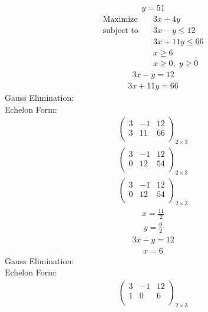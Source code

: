 \documentclass{article}
\begin{document}
\begin{align*}
y=51\end{align*}
\begin{align*}
\text{Maximize} \quad & 3x + 4y\\
\text{subject to} \quad
& 3x - y\le12\\
& 3x + 11y\le66\\
& x\ge6\\
& x\ge0,\; y\ge0\end{align*}
\begin{align*}
3x - y=12\end{align*}
\begin{align*}
3x + 11y=66\end{align*}
Gauss Elimination:\\
Echelon Form:\\
\begin{align*}
\left(
\begin{array}{cc|c}
3 & -1 & 12\\
3 & 11 & 66\\
\end{array}
\right)_{2\times 3}
\end{align*}
\begin{align*}
\left(
\begin{array}{cc|c}
3 & -1 & 12\\
0 & 12 & 54\\
\end{array}
\right)_{2\times 3}
\end{align*}
\begin{align*}
\left(
\begin{array}{cc|c}
3 & -1 & 12\\
0 & 12 & 54\\
\end{array}
\right)_{2\times 3}
\end{align*}
\begin{align*}
x=\frac{11}{2}\end{align*}
\begin{align*}
y=\frac{9}{2}\end{align*}
\begin{align*}
3x - y=12\end{align*}
\begin{align*}
x=6\end{align*}
Gauss Elimination:\\
Echelon Form:\\
\begin{align*}
\left(
\begin{array}{cc|c}
3 & -1 & 12\\
1 & 0 & 6\\
\end{array}
\right)_{2\times 3}
\end{align*}
\end{document}
